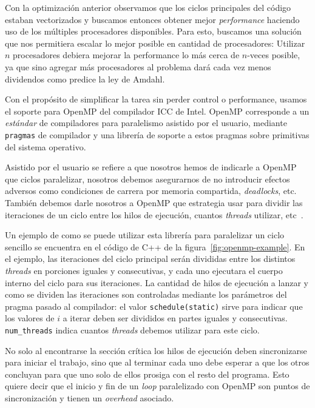 Con la optimizaci\'on anterior observamos que los ciclos principales del c\'odigo
estaban vectorizados y buscamos entonces obtener mejor \textit{performance} haciendo
uso de los m\'ultiples procesadores disponibles. Para esto, buscamos una soluci\'on
que nos permitiera escalar lo mejor posible en cantidad de procesadores: Utilizar
$n$ procesadores debiera mejorar la performance lo m\'as cerca de $n$-veces posible,
ya que sino agregar m\'as procesadores al problema dar\'a cada vez menos dividendos
como predice la ley de Amdahl.

Con el prop\'osito de simplificar la tarea sin perder control o performance,
usamos el soporte para OpenMP del compilador ICC de Intel. OpenMP corresponde a
un \textit{est\'andar} de compiladores para paralelismo asistido por el usuario,
mediante \texttt{pragmas} de compilador y una librer\'ia de soporte a estos
pragmas sobre primitivas del sistema operativo.

Asistido por el usuario se refiere a que nosotros hemos de indicarle a OpenMP
que ciclos paralelizar, nosotros debemos asegurarnos de no introducir efectos
adversos como condiciones de carrera por memoria compartida, \textit{deadlocks},
etc. Tambi\'en debemos darle nosotros a OpenMP que estrategia usar para dividir
las iteraciones de un ciclo entre los hilos de ejecuci\'on, cuantos
\textit{threads} utilizar, etc~\cite{OpenMPIntel}.

Un ejemplo de como se puede utilizar esta librer\'ia para paralelizar un ciclo
sencillo se encuentra en el c\'odigo de C++ de la figura~\ref{fig:openmp-example}.
En el ejemplo, las iteraciones del ciclo principal ser\'an divididas entre los
distintos \textit{threads} en porciones iguales y consecutivas, y cada uno
ejecutara el cuerpo interno del ciclo para sus iteraciones. La cantidad de
hilos de ejecuci\'on a lanzar y como se dividen las iteraciones son controladas
mediante los par\'ametros del pragma pasado al compilador: el valor
\texttt{schedule(static)} sirve para indicar que los valores de $i$ a iterar
deben ser divididos en partes iguales y consecutivas. \texttt{num\_threads} indica
cuantos \textit{threads} debemos utilizar para este ciclo.

No solo al encontrarse la secci\'on cr\'itica los hilos de ejecuci\'on deben
sincronizarse para iniciar el trabajo, sino que al terminar cada uno debe esperar
a que los otros concluyan para que uno solo de ellos prosiga con el resto del
programa. Esto quiere decir que el inicio y fin de un \textit{loop} paralelizado
con OpenMP son puntos de sincronizaci\'on y tienen un \textit{overhead} asociado.


